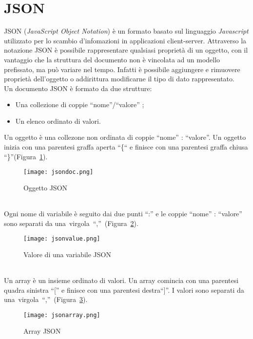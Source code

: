 \section{JSON}
JSON  (\emph{JavaScript Object Notation}) è un formato basato sul linguaggio
\emph{Javascript} utilizzato per lo scambio d'infomazioni in applicazioni
client-server. Attraverso la notazione JSON è possibile rappresentare qualsiasi
proprietà di un oggetto, con il vantaggio che la struttura del documento non è
vincolata ad un modello prefissato, ma può variare nel tempo. Infatti è
possibile aggiungere e rimuovere proprietà dell'oggetto o addirittura modificarne il tipo
di dato rappresentato.
\\Un documento JSON è formato da due strutture:
\begin{itemize}
  \item Una collezione di coppie ``nome''/``valore'' ;
  \item Un elenco ordinato di valori. 
\end{itemize}
Un oggetto è una collezone non ordinata di coppie ``nome'' : ``valore''. Un
oggetto inizia con una parentesi graffa aperta ``\{`` e finisce con una parentesi
graffa chiusa ``\}''(Figura~\ref{fig:jsondoc}).
\begin{figure}[!h]
  \begin{center}
      \texttt{[image: jsondoc.png]}
      \caption{Oggetto JSON}
      \label{fig:jsondoc}
  \end{center}
\end{figure}
\\Ogni nome di variabile è seguito dai due punti ``:'' e le coppie
``nome'' : ``valore'' sono separati
da una~virgola~``,''~(Figura~\ref{fig:jsonvalue}).
\begin{figure}[!h]
  \begin{center}
      \texttt{[image: jsonvalue.png]}
      \caption{Valore di una variabile JSON}
      \label{fig:jsonvalue}
  \end{center}
\end{figure}
\\Un array è un insieme ordinato di valori. Un array comincia con una parentesi
quadra sinistra ``{[}'' e finisce con una parentesi destra``{]}''. I valori
sono separati da una~virgola~``,''~(Figura~\ref{fig:jsonarray}).
\begin{figure}[!h]
\begin{center}
    \texttt{[image: jsonarray.png]}
    \caption{Array JSON}
    \label{fig:jsonarray}
\end{center}
\end{figure}
